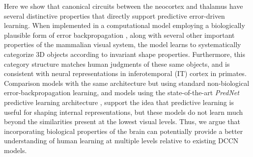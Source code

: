 \documentclass[12pt,twoside]{article}
\newif\myifpdf
\begin{document}
Here we show that canonical circuits between the neocortex and thalamus have several distinctive properties that directly support predictive error-driven learning.  When implemented in a computational model employing a biologically plausible form of error backpropagation \cite{OReilly96,OReillyMunakata00,OReillyMunakataFrankEtAl12}, along with several other important properties of the mammalian visual system, the model learns to systematically categorize 3D objects according to invariant shape properties.  Furthermore, this category structure matches human judgments of these same objects, and is consistent with neural representations in inferotemporal (IT) cortex in primates.  Comparison models with the same architecture but using standard non-biological error-backpropagation learning, and models using the state-of-the-art {\em PredNet} predictive learning architecture \cite{LotterKreimanCox16}, support the idea that predictive learning is useful for shaping internal representations, but these models do not learn much beyond the similarities present at the lowest visual levels.  Thus, we argue that incorporating biological properties of the brain can potentially provide a better understanding of human learning at multiple levels relative to existing DCCN models.
\end{document}
